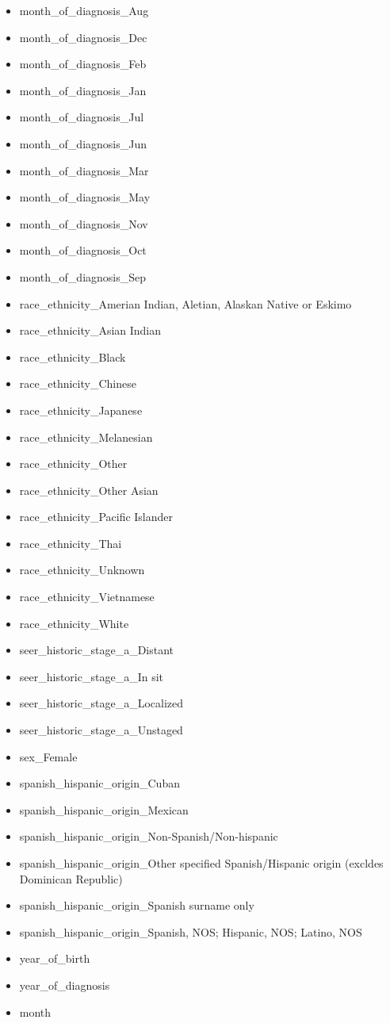 \documentclass[10pt,letterpaper]{article}
\begin{document}
\begin{itemize}[noitemsep]
\item month\_of\_diagnosis\_Aug
\item month\_of\_diagnosis\_Dec
\item month\_of\_diagnosis\_Feb
\item month\_of\_diagnosis\_Jan
\item month\_of\_diagnosis\_Jul
\item month\_of\_diagnosis\_Jun
\item month\_of\_diagnosis\_Mar
\item month\_of\_diagnosis\_May
\item month\_of\_diagnosis\_Nov
\item month\_of\_diagnosis\_Oct
\item month\_of\_diagnosis\_Sep
\item race\_ethnicity\_Amerian Indian, Aletian, Alaskan Native or Eskimo
\item race\_ethnicity\_Asian Indian
\item race\_ethnicity\_Black
\item race\_ethnicity\_Chinese
\item race\_ethnicity\_Japanese
\item race\_ethnicity\_Melanesian
\item race\_ethnicity\_Other
\item race\_ethnicity\_Other Asian
\item race\_ethnicity\_Pacific Islander
\item race\_ethnicity\_Thai
\item race\_ethnicity\_Unknown
\item race\_ethnicity\_Vietnamese
\item race\_ethnicity\_White
\item seer\_historic\_stage\_a\_Distant
\item seer\_historic\_stage\_a\_In sit
\item seer\_historic\_stage\_a\_Localized
\item seer\_historic\_stage\_a\_Unstaged
\item sex\_Female
\item spanish\_hispanic\_origin\_Cuban
\item spanish\_hispanic\_origin\_Mexican
\item spanish\_hispanic\_origin\_Non-Spanish/Non-hispanic
\item spanish\_hispanic\_origin\_Other specified Spanish/Hispanic origin (excldes Dominican Republic)
\item spanish\_hispanic\_origin\_Spanish surname only
\item spanish\_hispanic\_origin\_Spanish, NOS; Hispanic, NOS; Latino, NOS
\item year\_of\_birth
\item year\_of\_diagnosis
\item month
\end{itemize}
\end{document}
